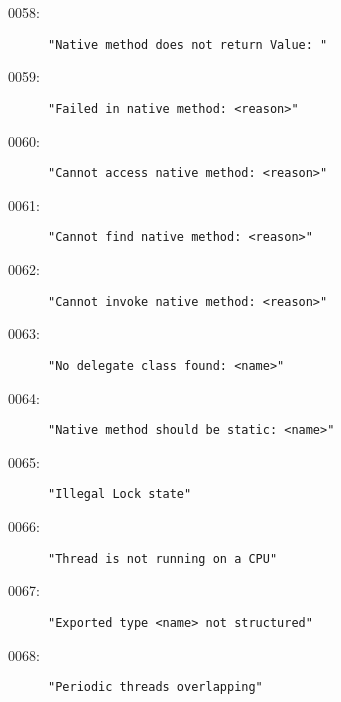 \begin{description}
\item[0058:] \texttt{"Native method does not return Value:\ "}
\item[0059:] \texttt{"Failed in native method:\ <reason>"}
\item[0060:] \texttt{"Cannot access native method:\ <reason>"}
\item[0061:] \texttt{"Cannot find native method:\ <reason>"}
\item[0062:] \texttt{"Cannot invoke native method:\ <reason>"}
\item[0063:] \texttt{"No delegate class found:\ <name>"}
\item[0064:] \texttt{"Native method should be static:\ <name>"}
\item[0065:] \texttt{"Illegal Lock state"}
\item[0066:] \texttt{"Thread is not running on a CPU"}
\item[0067:] \texttt{"Exported type <name> not structured"}
\item[0068:] \texttt{"Periodic threads overlapping"}
\end{description}
